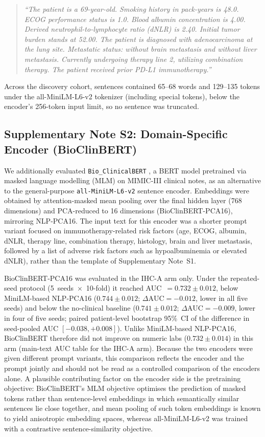 \documentclass[12pt]{article}
\begin{document}
\begin{quote}
\small
\raggedright
\textit{``The patient is a 69-year-old. Smoking history in pack-years is 48.0.
ECOG performance status is 1.0. Blood albumin concentration is 4.00. Derived
neutrophil-to-lymphocyte ratio (dNLR) is 2.40. Initial tumor burden stands
at 52.00. The patient is diagnosed with adenocarcinoma at the lung site.
Metastatic status: without brain metastasis and without liver metastasis.
Currently undergoing therapy line 2, utilizing combination therapy. The
patient received prior PD-L1 immunotherapy.''}
\end{quote}

Across the discovery cohort, sentences contained 65--68 words and 129--135
tokens under the all-MiniLM-L6-v2 tokenizer (including special tokens),
below the encoder's 256-token input limit, so no sentence was truncated.

\subsection*{Supplementary Note S2: Domain-Specific Encoder (BioClinBERT)}
\label{supp:note2}

We additionally evaluated \texttt{Bio\_ClinicalBERT} \cite{Alsentzer2019}, a
BERT model pretrained via masked language modelling (MLM) on MIMIC-III
clinical notes, as an alternative to the general-purpose
\texttt{all-MiniLM-L6-v2} sentence encoder. Embeddings were obtained by
attention-masked mean pooling over the final hidden layer (768 dimensions)
and PCA-reduced to 16 dimensions (BioClinBERT-PCA16), mirroring NLP-PCA16.
The input text for this encoder was a shorter prompt variant focused on
immunotherapy-related risk factors (age, ECOG, albumin, dNLR, therapy line,
combination therapy, histology, brain and liver metastasis, followed by a
list of adverse risk factors such as hypoalbuminemia or elevated dNLR),
rather than the template of Supplementary Note~S1.

BioClinBERT-PCA16 was evaluated in the IHC-A arm only. Under the repeated-seed
protocol (5~seeds~$\times$~10-fold) it reached AUC~$=0.732 \pm 0.012$, below
MiniLM-based NLP-PCA16 ($0.744 \pm 0.012$; $\Delta\text{AUC} = -0.012$, lower in
all five seeds) and below the no-clinical baseline ($0.741 \pm 0.012$;
$\Delta\text{AUC} = -0.009$, lower in four of five seeds; paired patient-level
bootstrap 95\%~CI of the difference in seed-pooled AUC $[-0.038, +0.008]$). Unlike MiniLM-based NLP-PCA16,
BioClinBERT therefore did not improve on numeric labs ($0.732 \pm 0.014$) in this arm
(main-text AUC table for the IHC-A arm).
Because the two encoders were given different prompt variants, this
comparison reflects the encoder and the prompt jointly and should not be read
as a controlled comparison of the encoders alone.
A plausible contributing factor on the encoder side is the pretraining
objective: BioClinBERT's MLM objective optimises the prediction of masked
tokens rather than sentence-level embeddings in which semantically similar
sentences lie close together, and mean pooling of such token embeddings is
known to yield anisotropic embedding spaces, whereas all-MiniLM-L6-v2 was
trained with a contrastive sentence-similarity objective.
\end{document}
